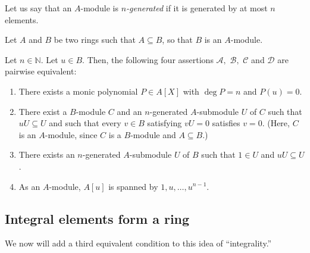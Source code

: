 \begin{exercise} Let us say that an $A$-module is \emph{$n$-generated}
if it is generated by at most $n$ elements. 

Let $A$ and $B$ be two rings such that $A\subseteq B$, so that $B$ is an
$A$-module.

Let
$n\in\mathbb{N}$. Let $u\in B$. Then, the following four assertions
$\mathcal{A},$ $\mathcal{B},$ $\mathcal{C}$ and $\mathcal{D}$ are pairwise equivalent:

\begin{enumerate}
\item   There exists a monic polynomial
$P\in A\left[  X\right]  $ with $\deg P=n$ and $P\left(  u\right)  =0$.
\item  There exist a $B$-module $C$ and an
$n$-generated $A$-submodule $U$ of $C$ such that $uU\subseteq U$ and such that
every $v\in B$ satisfying $vU=0$ satisfies $v=0$. (Here, $C$ is an $A$-module,
since $C$ is a $B$-module and $A\subseteq B$.)
\item  There exists an $n$-generated
$A$-submodule $U$ of $B$ such that $1\in U$ and $uU\subseteq U$.
\item  As an $A$-module, $A[u]$ is spanned by $1, u, \dots,
u^{n-1}$.\end{enumerate}
\end{exercise} 
\subsection{Integral elements form a ring}

We now will add a third equivalent condition to this idea of ``integrality.''

